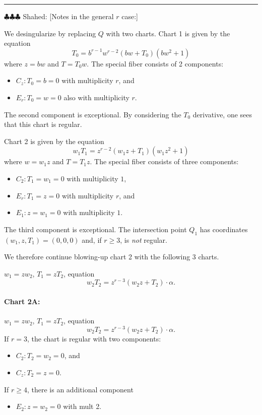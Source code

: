 \documentclass{article}
\newcommand{\shahed}[1]{{\color{Purple} \sf $\clubsuit\clubsuit\clubsuit$ Shahed: [#1]}}
\theoremstyle{plain}
\theoremstyle{definition}
\theoremstyle{remark}
\begin{document}
\hrule
\bigskip

\shahed{Notes in the general $r$ case:}

We desingularize by replacing $Q$ with two charts. Chart 1 is given by the equation
\[
T_0 = b^{r-1}w^{r-2}(bw + T_0)(bw^2 + 1)
\]
where $z = bw$ and $T = T_0w$. The special fiber consists of 2 components:
\begin{itemize}
    \item $C_z: T_0 = b = 0$ with multiplicity $r$, and
    \item $E_r: T_0 = w = 0$ also with multiplicity $r$.
\end{itemize}
 The second component is exceptional. By considering the $T_0$ derivative, one sees that this chart is regular.

Chart 2 is given by the equation
\[
w_1 T_1 = z^{r-2}(w_1z + T_1)(w_1 z^2 + 1)
\]
where $w = w_1 z$ and $T = T_1 z$. The special fiber consists of three components:
\begin{itemize}
    \item $C_2: T_1 = w_1 = 0$ with multiplicity $1$,
    \item $E_r: T_1 = z = 0$ with multiplicity $r$, and
    \item $E_1: z = w_1 = 0$ with multiplicity $1$.
\end{itemize}
The third component is exceptional. The intersection point $Q_1$ has coordinates $(w_1, z, T_1) = (0,0,0)$ and, if $r \geq 3$, is \emph{not} regular.

We therefore continue blowing-up chart 2 with the following 3 charts.

$w_1 = z w_2$, $T_1 = z T_2$, equation 
\[
w_2T_2 = z^{r-3}(w_2 z + T_2) \cdot \alpha.
\]

\paragraph{Chart 2A:}
\label{sec:chart-a}

$w_1 = z w_2$, $T_1 = z T_2$, equation 
\[
w_2T_2 = z^{r-3}(w_2 z + T_2) \cdot \alpha.
\]
If $r = 3$, the chart is regular with two components:
\begin{itemize}
    \item $C_2: T_2 = w_2 = 0$, and
    \item $C_z: T_2 = z = 0$.
\end{itemize}
If $r \geq 4$, there is an additional component
\begin{itemize}
    \item $E_2: z = w_2 = 0$ with mult 2.
\end{itemize}
\end{document}
